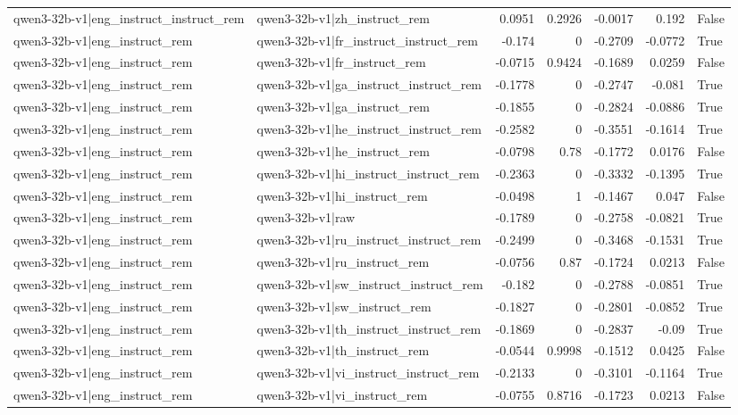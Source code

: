 \begin{table}
\begin{tabular}{l l r r r r l}
qwen3-32b-v1|eng_instruct_instruct_rem & qwen3-32b-v1|zh_instruct_rem & 0.0951 & 0.2926 & -0.0017 & 0.192 & False \\
qwen3-32b-v1|eng_instruct_rem & qwen3-32b-v1|fr_instruct_instruct_rem & -0.174 & 0 & -0.2709 & -0.0772 & True \\
qwen3-32b-v1|eng_instruct_rem & qwen3-32b-v1|fr_instruct_rem & -0.0715 & 0.9424 & -0.1689 & 0.0259 & False \\
qwen3-32b-v1|eng_instruct_rem & qwen3-32b-v1|ga_instruct_instruct_rem & -0.1778 & 0 & -0.2747 & -0.081 & True \\
qwen3-32b-v1|eng_instruct_rem & qwen3-32b-v1|ga_instruct_rem & -0.1855 & 0 & -0.2824 & -0.0886 & True \\
qwen3-32b-v1|eng_instruct_rem & qwen3-32b-v1|he_instruct_instruct_rem & -0.2582 & 0 & -0.3551 & -0.1614 & True \\
qwen3-32b-v1|eng_instruct_rem & qwen3-32b-v1|he_instruct_rem & -0.0798 & 0.78 & -0.1772 & 0.0176 & False \\
qwen3-32b-v1|eng_instruct_rem & qwen3-32b-v1|hi_instruct_instruct_rem & -0.2363 & 0 & -0.3332 & -0.1395 & True \\
qwen3-32b-v1|eng_instruct_rem & qwen3-32b-v1|hi_instruct_rem & -0.0498 & 1 & -0.1467 & 0.047 & False \\
qwen3-32b-v1|eng_instruct_rem & qwen3-32b-v1|raw & -0.1789 & 0 & -0.2758 & -0.0821 & True \\
qwen3-32b-v1|eng_instruct_rem & qwen3-32b-v1|ru_instruct_instruct_rem & -0.2499 & 0 & -0.3468 & -0.1531 & True \\
qwen3-32b-v1|eng_instruct_rem & qwen3-32b-v1|ru_instruct_rem & -0.0756 & 0.87 & -0.1724 & 0.0213 & False \\
qwen3-32b-v1|eng_instruct_rem & qwen3-32b-v1|sw_instruct_instruct_rem & -0.182 & 0 & -0.2788 & -0.0851 & True \\
qwen3-32b-v1|eng_instruct_rem & qwen3-32b-v1|sw_instruct_rem & -0.1827 & 0 & -0.2801 & -0.0852 & True \\
qwen3-32b-v1|eng_instruct_rem & qwen3-32b-v1|th_instruct_instruct_rem & -0.1869 & 0 & -0.2837 & -0.09 & True \\
qwen3-32b-v1|eng_instruct_rem & qwen3-32b-v1|th_instruct_rem & -0.0544 & 0.9998 & -0.1512 & 0.0425 & False \\
qwen3-32b-v1|eng_instruct_rem & qwen3-32b-v1|vi_instruct_instruct_rem & -0.2133 & 0 & -0.3101 & -0.1164 & True \\
qwen3-32b-v1|eng_instruct_rem & qwen3-32b-v1|vi_instruct_rem & -0.0755 & 0.8716 & -0.1723 & 0.0213 & False \\

\end{tabular}
\end{table}
